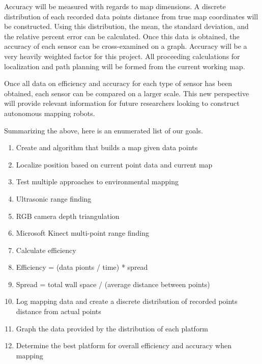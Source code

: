 \documentclass{article}
\begin{document}
	Accuracy will be measured with regards to map dimensions.  A
        discrete distribution of each recorded data points distance
        from true map coordinates will be constructed.  Using this
        distribution, the mean, the standard deviation, and the
        relative percent error can be calculated.  Once this data is
        obtained, the accuracy of each sensor can be cross-examined on
        a graph.  Accuracy will be a very heavily weighted factor for
        this project.  All proceeding calculations for localization
        and path planning will be formed from the current working map.

	Once all data on efficiency and accuracy for each type of
        sensor has been obtained, each sensor can be compared on a
        larger scale.  This new perspective will provide relevant
        information for future researchers looking to construct
        autonomous mapping robots.

        Summarizing the above, here is an enumerated list of our
        goals.

\begin{enumerate}

\item      Create and algorithm that builds a map given data points
\item      Localize position based on current point data and current map
\item      Test multiple approaches to environmental mapping
\item      	   Ultrasonic range finding
\item	   RGB camera depth triangulation
\item	   Microsoft Kinect multi-point range finding
\item      Calculate efficiency
\item      	   Efficiency = (data pionts / time) * spread
\item	   Spread = total wall space / (average distance between points)
\item      Log mapping data and create a discrete distribution of recorded points distance from actual points
\item      Graph the data provided by the distribution of each platform
\item      Determine the best platform for overall efficiency and
  accuracy when mapping
\end{enumerate}


%

\end{document}
